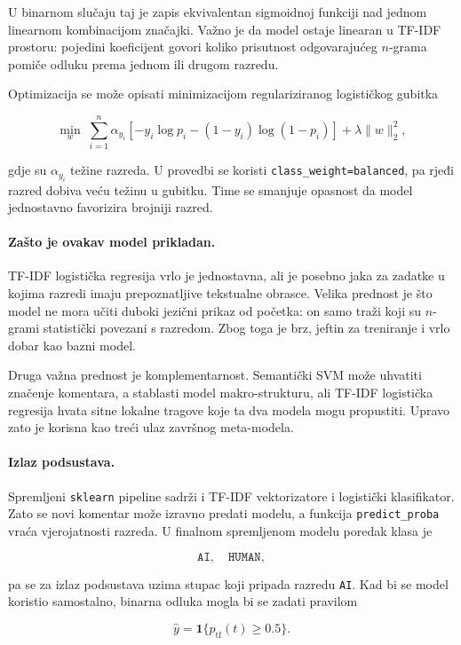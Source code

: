 \documentclass{article}
\begin{document}
U binarnom slučaju taj je zapis ekvivalentan sigmoidnoj funkciji nad jednom linearnom kombinacijom značajki. Važno je da model ostaje linearan u TF-IDF prostoru: pojedini koeficijent govori koliko prisutnost odgovarajućeg $n$-grama pomiče odluku prema jednom ili drugom razredu.

Optimizacija se može opisati minimizacijom regulariziranog logističkog gubitka

\[
\min_w\;
\sum_{i=1}^{n}\alpha_{y_i}
\left[-y_i\log p_i-(1-y_i)\log(1-p_i)\right]
+\lambda\|w\|_2^2,
\]

gdje su $\alpha_{y_i}$ težine razreda. U provedbi se koristi \texttt{class\_weight=balanced}, pa rjeđi razred dobiva veću težinu u gubitku. Time se smanjuje opasnost da model jednostavno favorizira brojniji razred.

\paragraph{Zašto je ovakav model prikladan.}
TF-IDF logistička regresija vrlo je jednostavna, ali je posebno jaka za zadatke u kojima razredi imaju prepoznatljive tekstualne obrasce. Velika prednost je što model ne mora učiti duboki jezični prikaz od početka: on samo traži koji su $n$-grami statistički povezani s razredom. Zbog toga je brz, jeftin za treniranje i vrlo dobar kao bazni model.

Druga važna prednost je komplementarnost. Semantički SVM može uhvatiti značenje komentara, a stablasti model makro-strukturu, ali TF-IDF logistička regresija hvata sitne lokalne tragove koje ta dva modela mogu propustiti. Upravo zato je korisna kao treći ulaz završnog meta-modela.

\paragraph{Izlaz podsustava.}
Spremljeni \texttt{sklearn} pipeline sadrži i TF-IDF vektorizatore i logistički klasifikator. Zato se novi komentar može izravno predati modelu, a funkcija \texttt{predict\_proba} vraća vjerojatnosti razreda. U finalnom spremljenom modelu poredak klasa je

\[
\texttt{AI},\quad \texttt{HUMAN},
\]

pa se za izlaz podsustava uzima stupac koji pripada razredu \texttt{AI}. Kad bi se model koristio samostalno, binarna odluka mogla bi se zadati pravilom

\[
\hat y = \mathbf{1}\{p_{\mathrm{tf}}(t)\ge 0.5\}.
\]
\end{document}
